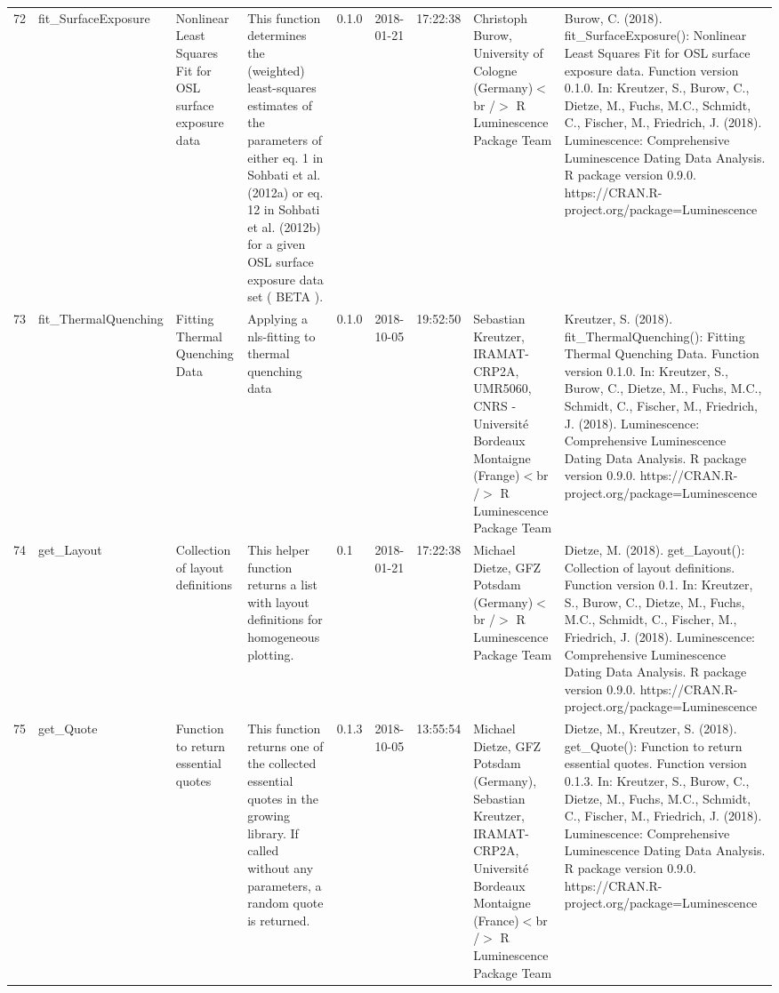 \begin{table}[ht]
\begin{tabular}{rllllllll}
 \\ 
  72 & fit\_SurfaceExposure & Nonlinear Least Squares Fit for OSL surface exposure data & This function determines the (weighted) least-squares estimates of the parameters of either eq. 1 in  Sohbati et al. (2012a)  or eq. 12 in Sohbati et al. (2012b)  for a given OSL surface exposure data set ( BETA ). & 0.1.0 & 2018-01-21 & 17:22:38
 & Christoph Burow, University of Cologne (Germany)$<$br /$>$  R Luminescence Package Team & Burow, C. (2018). fit\_SurfaceExposure(): Nonlinear Least Squares Fit for OSL surface exposure data. Function version 0.1.0. In: Kreutzer, S., Burow, C., Dietze, M., Fuchs, M.C., Schmidt, C., Fischer, M., Friedrich, J. (2018). Luminescence: Comprehensive Luminescence Dating Data Analysis. R package version 0.9.0. https://CRAN.R-project.org/package=Luminescence
 \\ 
  73 & fit\_ThermalQuenching & Fitting Thermal Quenching Data & Applying a nls-fitting to thermal quenching data & 0.1.0 & 2018-10-05 & 19:52:50
 & Sebastian Kreutzer, IRAMAT-CRP2A, UMR5060, CNRS - Université Bordeaux Montaigne (Frange)$<$br /$>$  R Luminescence Package Team & Kreutzer, S. (2018). fit\_ThermalQuenching(): Fitting Thermal Quenching Data. Function version 0.1.0. In: Kreutzer, S., Burow, C., Dietze, M., Fuchs, M.C., Schmidt, C., Fischer, M., Friedrich, J. (2018). Luminescence: Comprehensive Luminescence Dating Data Analysis. R package version 0.9.0. https://CRAN.R-project.org/package=Luminescence
 \\ 
  74 & get\_Layout & Collection of layout definitions & This helper function returns a list with layout definitions for homogeneous plotting. & 0.1 & 2018-01-21 & 17:22:38
 & Michael Dietze, GFZ Potsdam (Germany)$<$br /$>$  R Luminescence Package Team & Dietze, M. (2018). get\_Layout(): Collection of layout definitions. Function version 0.1. In: Kreutzer, S., Burow, C., Dietze, M., Fuchs, M.C., Schmidt, C., Fischer, M., Friedrich, J. (2018). Luminescence: Comprehensive Luminescence Dating Data Analysis. R package version 0.9.0. https://CRAN.R-project.org/package=Luminescence
 \\ 
  75 & get\_Quote & Function to return essential quotes & This function returns one of the collected essential quotes in the growing library. If called without any parameters, a random quote is returned. & 0.1.3 & 2018-10-05 & 13:55:54
 & Michael Dietze, GFZ Potsdam (Germany), Sebastian Kreutzer, IRAMAT-CRP2A, Université Bordeaux Montaigne (France)$<$br /$>$  R Luminescence Package Team & Dietze, M., Kreutzer, S. (2018). get\_Quote(): Function to return essential quotes. Function version 0.1.3. In: Kreutzer, S., Burow, C., Dietze, M., Fuchs, M.C., Schmidt, C., Fischer, M., Friedrich, J. (2018). Luminescence: Comprehensive Luminescence Dating Data Analysis. R package version 0.9.0. https://CRAN.R-project.org/package=Luminescence

\end{tabular}
\end{table}

